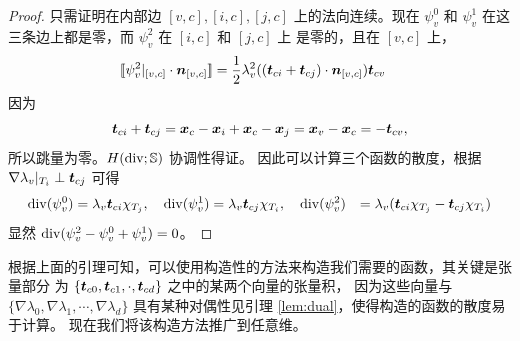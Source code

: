 \documentclass[letterpaper,12pt]{article}
\begin{document}
\begin{proof}
只需证明在内部边 $[v, c], [i, c], [j, c]$ 上的法向连续。现在 $\psi_v^0$ 和
$\psi_v^1$ 在这三条边上都是零，而 $\psi_v^2$ 在 $[i, c]$ 和 $[j, c]$ 上
是零的，且在 $[v, c]$ 上，
$$
\begin{aligned}
    [\![\psi_v^2|_{[v, c]}\cdot \bsn_{[v, c]}]\!] & = \frac{1}{2}\lambda_v^2  
((\bst_{ci} + \bst_{cj}) \cdot \bsn_{[v, c]})\bst_{cv}
\end{aligned}
$$
因为 
$$
\boldsymbol{t}_{ci} + \boldsymbol{t}_{cj} = \boldsymbol{x}_c - \boldsymbol{x}_i + \boldsymbol{x}_c - \boldsymbol{x}_j = \boldsymbol{x}_v -
\boldsymbol{x}_c = -\boldsymbol{t}_{cv}, 
$$
所以跳量为零。$H(\operatorname{div}; \mathbb{S})$ 协调性得证。
因此可以计算三个函数的散度，根据 $\nabla \lambda_v|_{T_i} \perp \boldsymbol{t}_{cj}$ 可得
$$
\begin{aligned}
    \operatorname{div}(\psi_v^0) & = \lambda_v \boldsymbol{t}_{ci} \chi_{T_j}, \quad 
    \operatorname{div}(\psi_v^1) = \lambda_v \boldsymbol{t}_{cj} \chi_{T_i},\quad
    \operatorname{div}(\psi_v^2) & = \lambda_v (\boldsymbol{t}_{ci} \chi_{T_j} - \boldsymbol{t}_{cj} \chi_{T_i})
\end{aligned}
$$
显然 $\operatorname{div}(\psi_v^2 - \psi_v^0 + \psi_v^1) = 0$。
\end{proof}

根据上面的引理可知，可以使用构造性的方法来构造我们需要的函数，其关键是张量部分
为 $\{\boldsymbol{t}_{c0}, \boldsymbol{t}_{c1}, \cdot, \boldsymbol{t}_{cd}\}$ 之中的某两个向量的张量积，
因为这些向量与 $\{\nabla \lambda_0, \nabla \lambda_1, \cdots, \nabla
\lambda_d\}$ 具有某种对偶性见引理 \ref{lem:dual}，使得构造的函数的散度易于计算。
现在我们将该构造方法推广到任意维。
\end{document}
